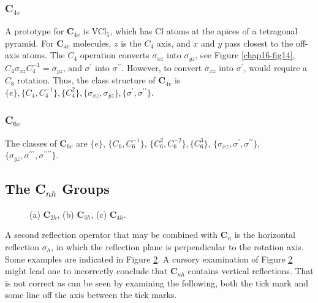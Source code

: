 \subsubsection{C$_{4v}$}

\begin{figure}
\caption{}
\label{chap16-fig17}
\end{figure}

A prototype for {\bf C}$_{4v}$ is VCl$_5$, which has Cl atoms at the
apices of a tetragonal pyramid.  For {\bf C}$_{4v}$ molecules, $z$ is
the $C_4$ axis, and $x$ and $y$ pass closest to the off-axis atoms.
The $C_4$ operation converts $\sigma_{xz}$ into $\sigma_{yz}$, see
Figure \ref{chap16-fig14}, $C_4 \sigma_{xz}C^{-1}_4 = \sigma_{yz}$,
and $\sigma^{\prime}$ into $\sigma^{\prime \prime}$.  However, to
convert $\sigma_{xz}$ into $\sigma^{\prime}$, would require a $C_8$
rotation.  Thus, the class structure of {\bf C}$_{4v}$ is $\{e\} ,
\{C_4 , C_4^{-1}\} , \{C^2_4\}, \{\sigma_{xz} , \sigma_{yz}\} ,
\{\sigma^{\prime} , \sigma^{\prime \prime}\}$.

\subsubsection{C$_{6v}$}

The classes of {\bf C}$_{6v}$ are $\{e\}$, $\{C_6 , C_6^{-1}\}$, 
$\{C^2_6 , C_6^{-2}\} , \{C^3_6\}$, $\{\sigma_{xz} , \sigma^{\prime} , 
\sigma^{\prime \prime}\}$, $\{ \sigma_{yz}, \sigma^{\prime \prime 
\prime} , \sigma^{\prime \prime \prime \prime}\}$.

\subsection{The C$_{nh}$ Groups}

\begin{figure}
\caption{(a) {\bf C}$_{2h}$, (b) {\bf C}$_{3h}$, (c) {\bf C}$_{4h}$.}
\label{chap16-fig18}
\end{figure}

A second reflection operator that may be combined with {\bf C}$_n$ is
the horizontal reflection $\sigma_h$, in which the reflection plane is
perpendicular to the rotation axis.  Some examples are indicated in
Figure \ref{chap16-fig18}.  A cursory examination of Figure
\ref{chap16-fig18} might lead one to incorrectly conclude that {\bf
C}$_{nh}$ contains vertical reflections.  That is not correct as can
be seen by examining the following, both the tick mark and some line
off the axis between the tick marks.


